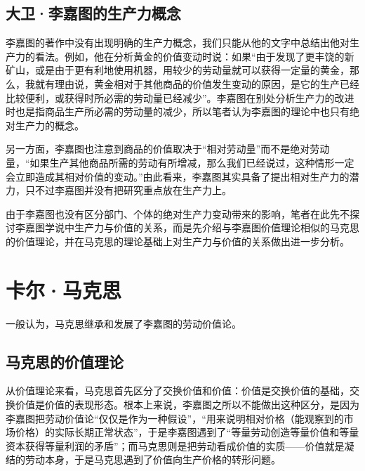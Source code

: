 \subsection{大卫·李嘉图的生产力概念}

李嘉图的著作中没有出现明确的生产力概念，我们只能从他的文字中总结出他对生产力的看法。例如，他在分析黄金的价值变动时说：如果“由于发现了更丰饶的新矿山，或是由于更有利地使用机器，用较少的劳动量就可以获得一定量的黄金，那么，我就有理由说，黄金相对于其他商品的价值发生变动的原因，是它的生产已经比较便利，或获得时所必需的劳动量已经减少”\cite[11]{DaWei*LiJiaTuZhengZhiJingJiXueJiFuShuiYuanLi2021}。李嘉图在别处分析生产力的改进时也是指商品生产所必需的劳动量的减少，所以笔者认为李嘉图的理论中也只有绝对生产力的概念。

另一方面，李嘉图也注意到商品的价值取决于“相对劳动量”而不是绝对劳动量\cite[5]{DaWei*LiJiaTuZhengZhiJingJiXueJiFuShuiYuanLi2021}，“如果生产其他商品所需的劳动有所增减，那么我们已经说过，这种情形一定会立即造成其相对价值的变动。”\cite[21]{DaWei*LiJiaTuZhengZhiJingJiXueJiFuShuiYuanLi2021}由此看来，李嘉图其实具备了提出相对生产力的潜力，只不过李嘉图并没有把研究重点放在生产力上。

由于李嘉图也没有区分部门、个体的绝对生产力变动带来的影响，笔者在此先不探讨李嘉图学说中生产力与价值的关系，而是先介绍与李嘉图价值理论相似的马克思的价值理论，并在马克思的理论基础上对生产力与价值的关系做出进一步分析。

\section{卡尔·马克思}

一般认为，马克思继承和发展了李嘉图的劳动价值论\cite[347]{YueSeFu*XiongBiTeJingJiFenXiShiDi2Juan2017}\cite[84]{ChenDaiSunCongGuDianJingJiXuePaiDaoMaKeSiRuoGanZhuYaoXueShuoFaZhanLueLun2014}。

\subsection{马克思的价值理论}

从价值理论来看，马克思首先区分了交换价值和价值：价值是交换价值的基础，交换价值是价值的表现形态\cite[86-88]{ChenDaiSunCongGuDianJingJiXuePaiDaoMaKeSiRuoGanZhuYaoXueShuoFaZhanLueLun2014}。根本上来说，李嘉图之所以不能做出这种区分，是因为李嘉图把劳动价值论“仅仅是作为一种假设”，“用来说明相对价格（能观察到的市场价格）的实际长期正常状态”\cite[348]{YueSeFu*XiongBiTeJingJiFenXiShiDi2Juan2017}，于是李嘉图遇到了“等量劳动创造等量价值和等量资本获得等量利润的矛盾”\cite[144]{CaiJiMingCongGuDianZhengZhiJingJiXueDaoZhongGuoTeSeSheHuiZhuYiZhengZhiJingJiXueJiYuZhongGuoShiJiaoDeZhengZhiJingJiXueYanBianShangCe2023}\cite[21-28]{DaWei*LiJiaTuZhengZhiJingJiXueJiFuShuiYuanLi2021}；而马克思则是把劳动看成价值的实质——价值就是凝结的劳动本身，于是马克思遇到了价值向生产价格的转形问题\cite[348-350]{YueSeFu*XiongBiTeJingJiFenXiShiDi2Juan2017}\cite[159]{CaiJiMingCongGuDianZhengZhiJingJiXueDaoZhongGuoTeSeSheHuiZhuYiZhengZhiJingJiXueJiYuZhongGuoShiJiaoDeZhengZhiJingJiXueYanBianShangCe2023}。

